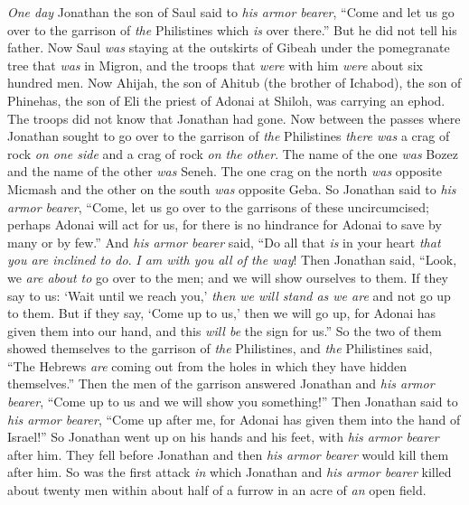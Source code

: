 \begin{biblechapter} %
 \textit{One day} Jonathan the son of Saul said to \textit{his armor bearer}, “Come and let us go over to the garrison of \textit{the} Philistines which \textit{is} over there.” But he did not tell his father.
\verse Now Saul \textit{was} staying at the outskirts of Gibeah under the pomegranate tree that \textit{was} in Migron, and the troops that \textit{were} with him \textit{were} about six hundred men.
\verse Now Ahijah, the son of Ahitub (the brother of Ichabod), the son of Phinehas, the son of Eli the priest of Adonai at Shiloh, was carrying an ephod. The troops did not know that Jonathan had gone.
\verse Now between the passes where Jonathan sought to go over to the garrison of \textit{the} Philistines \textit{there was} a crag of rock \textit{on one side} and a crag of rock \textit{on the other}. The name of the one \textit{was} Bozez and the name of the other \textit{was} Seneh.
\verse The one crag on the north \textit{was} opposite Micmash and the other on the south \textit{was} opposite Geba.
\verse So Jonathan said to \textit{his armor bearer}, “Come, let us go over to the garrisons of these uncircumcised; perhaps Adonai will act for us, for there is no hindrance for Adonai to save by many or by few.”
\verse And \textit{his armor bearer} said, “Do all that \textit{is} in your heart \textit{that you are inclined to do}. \textit{I am with you all of the way}!
\verse Then Jonathan said, “Look, we \textit{are about to} go over to the men; and we will show ourselves to them.
\verse If they say to us: ‘Wait until we reach you,’ \textit{then we will stand as we are} and not go up to them.
\verse But if they say, ‘Come up to us,’ then we will go up, for Adonai has given them into our hand, and this \textit{will be} the sign for us.”
\verse So the two of them showed themselves to the garrison of \textit{the} Philistines, and \textit{the} Philistines said, “The Hebrews \textit{are} coming out from the holes in which they have hidden themselves.”
\verse Then the men of the garrison answered Jonathan and \textit{his armor bearer}, “Come up to us and we will show you something!” Then Jonathan said to \textit{his armor bearer}, “Come up after me, for Adonai has given them into the hand of Israel!”
\verse So Jonathan went up on his hands and his feet, with \textit{his armor bearer} after him. They fell before Jonathan and then \textit{his armor bearer} would kill them after him.
\verse So was the first attack \textit{in} which Jonathan and \textit{his armor bearer} killed about twenty men within about half of a furrow in an acre of \textit{an} open field.

\end{biblechapter}
